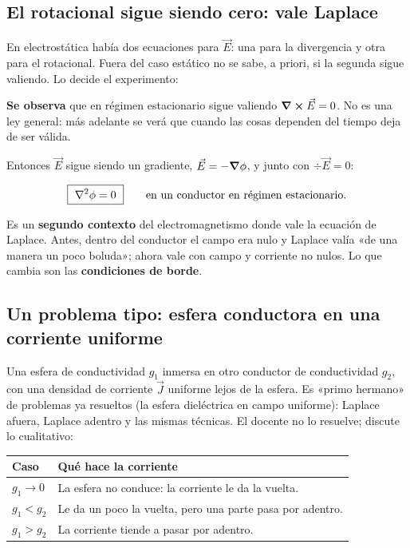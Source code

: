\documentclass[12pt,a4paper]{article}
\begin{document}
\subsection{El rotacional sigue siendo cero: vale Laplace}

En electrostática había dos ecuaciones para $\vec E$: una para la divergencia y
otra para el rotacional. Fuera del caso estático no se sabe, a priori, si la
segunda sigue valiendo. Lo decide el experimento:

\begin{notebox}
\textbf{Se observa} que en régimen estacionario sigue valiendo
$\curl \vec E = 0$. No es una ley general: más adelante se verá que
cuando las cosas dependen del tiempo deja de ser válida.
\end{notebox}

Entonces $\vec E$ sigue siendo un gradiente, $\vec E = -\vnabla\phi$, y junto con
$\div \vec E = 0$:

\begin{keybox}
\[
\boxed{\ \laplacian \phi = 0\ } \qquad \text{en un conductor en régimen estacionario.}
\]
\end{keybox}

Es un \textbf{segundo contexto} del electromagnetismo donde vale la ecuación de
Laplace. Antes, dentro del conductor el campo era nulo y Laplace valía «de una
manera un poco boluda»; ahora vale con campo y corriente no nulos. Lo que cambia
son las \textbf{condiciones de borde}.

\subsection{Un problema tipo: esfera conductora en una corriente uniforme}

Una esfera de conductividad $g_1$ inmersa en otro conductor de conductividad
$g_2$, con una densidad de corriente $\vec J$ uniforme lejos de la esfera. Es
«primo hermano» de problemas ya resueltos (la esfera dieléctrica en campo
uniforme): Laplace afuera, Laplace adentro y las mismas técnicas. El docente no
lo resuelve; discute lo cualitativo:

\begin{center}
\renewcommand{\arraystretch}{1.35}
\small
\begin{tabularx}{\textwidth}{l>{\raggedright\arraybackslash}X}
\toprule
\textbf{Caso} & \textbf{Qué hace la corriente} \\
\midrule
$g_1 \to 0$ & La esfera no conduce: la corriente le da la vuelta. \\
$g_1 < g_2$ & Le da un poco la vuelta, pero una parte pasa por adentro. \\
$g_1 > g_2$ & La corriente tiende a pasar por adentro. \\
\bottomrule
\end{tabularx}
\end{center}
\end{document}
